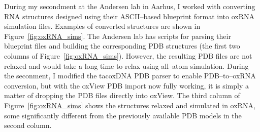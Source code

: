 \label{sec:converting_rna_origami}
During my secondment at the Andersen lab in Aarhus, I worked with converting RNA structures designed using their ASCII--based blueprint format into oxRNA simulation files. Examples of converted structures are shown in Figure~\ref{fig:oxRNA_sims}. The Andersen lab has scripts for parsing their blueprint files and building the corresponding PDB structures (the first two columns of Figure~\ref{fig:oxRNA_sims}). However, the resulting PDB files are not relaxed and would take a long time to relax using all--atom simulation. During the seconment, I modified the tacoxDNA \cite{suma2019tacoxdna} PDB parser to enable PDB--to--oxRNA conversion, but with the oxView PDB import now fully working, it is simply a matter of dropping the PDB files directly into oxView. The third column of Figure~\ref{fig:oxRNA_sims} shows the structures relaxed and simulated in oxRNA, some significantly different from the previously available PDB models in the second column.


